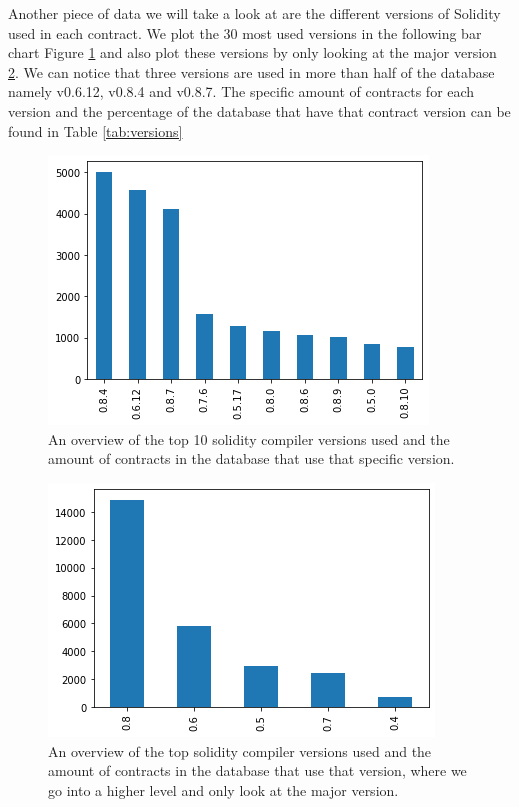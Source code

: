 \documentclass[10pt,conference]{IEEEtran}
\begin{document}
Another piece of data we will take a look at are the different versions of Solidity used in each contract. We plot the 30 most used versions in the following bar chart Figure \ref{fig:compiler} and also plot these versions by only looking at the major version \ref{fig:compiler_major}. We can notice that three versions are used in more than half of the database namely v0.6.12, v0.8.4 and v0.8.7. The specific amount of contracts for each version and the percentage of the database that have that contract version can be found in Table \ref{tab:versions}
\begin{figure}[h]
  \centering
  \includegraphics[width=\linewidth]{img/versions_v3.png}
  \caption{An overview of the top 10 solidity compiler versions used and the amount of contracts in the database that use that specific version. }
  \label{fig:compiler}
\end{figure}

\begin{figure}[h]
  \centering
  \includegraphics[width=\linewidth]{img/major_versions.png}
  \caption{An overview of the top solidity compiler versions used and the amount of contracts in the database that use that version, where we go into a higher level and only look at the major version. }
  \label{fig:compiler_major}
\end{figure}
\end{document}
